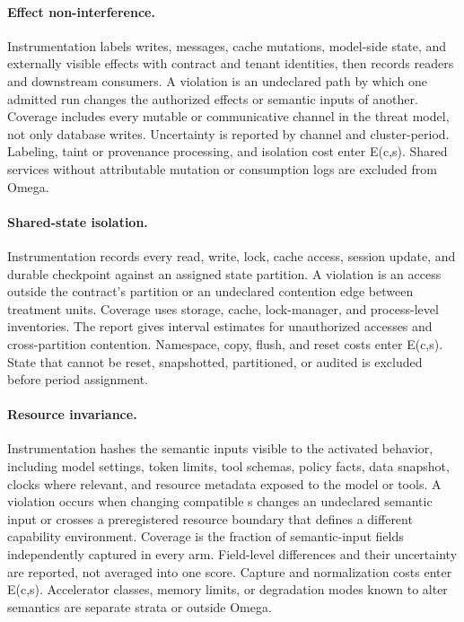 \paragraph{Effect non-interference.}
Instrumentation labels writes, messages, cache mutations, model-side state, and externally visible effects with contract and tenant identities, then records readers and downstream consumers. A violation is an undeclared path by which one admitted run changes the authorized effects or semantic inputs of another. Coverage includes every mutable or communicative channel in the threat model, not only database writes. Uncertainty is reported by channel and cluster-period. Labeling, taint or provenance processing, and isolation cost enter E(c,s). Shared services without attributable mutation or consumption logs are excluded from Omega.

\paragraph{Shared-state isolation.}
Instrumentation records every read, write, lock, cache access, session update, and durable checkpoint against an assigned state partition. A violation is an access outside the contract's partition or an undeclared contention edge between treatment units. Coverage uses storage, cache, lock-manager, and process-level inventories. The report gives interval estimates for unauthorized accesses and cross-partition contention. Namespace, copy, flush, and reset costs enter E(c,s). State that cannot be reset, snapshotted, partitioned, or audited is excluded before period assignment.

\paragraph{Resource invariance.}
Instrumentation hashes the semantic inputs visible to the activated behavior, including model settings, token limits, tool schemas, policy facts, data snapshot, clocks where relevant, and resource metadata exposed to the model or tools. A violation occurs when changing compatible s changes an undeclared semantic input or crosses a preregistered resource boundary that defines a different capability environment. Coverage is the fraction of semantic-input fields independently captured in every arm. Field-level differences and their uncertainty are reported, not averaged into one score. Capture and normalization costs enter E(c,s). Accelerator classes, memory limits, or degradation modes known to alter semantics are separate strata or outside Omega.

